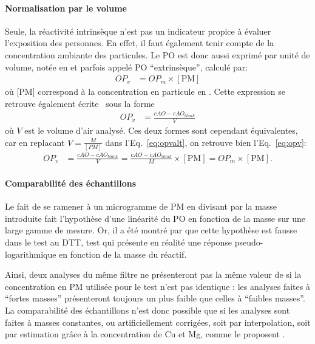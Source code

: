 \paragraph{Normalisation par le volume}%
\label{par:normalisation_par_le_volume}

Seule, la réactivité intrinsèque n'est pas un indicateur propice à évaluer
l'exposition des personnes. En
effet, il faut également tenir compte de la concentration ambiante des particules. Le PO
est donc aussi exprimé par unité de volume, notée \OPv{} en \si{\opv} et parfois appelé PO
``extrinsèque'', calculé par:
\begin{align}
    \label{eq:opv}
    OP_v &= OP_m \times [\text{PM}]
\end{align}
où [PM] correspond à la concentration en particule en \si{\ugm}. Cette expression se
retrouve également écrite~\autocite{fangSemiautomated2015} sous la forme
\begin{align}
    \label{eq:opvalt}
    OP_v &= \frac{cAO - cAO_{blank}}{V}
\end{align}
où $V$ est le volume d'air analysé. Ces deux formes sont cependant équivalentes, car en
replacant $V = \frac{M}{[PM]}$ dans l'Eq.~\ref{eq:opvalt}, on retrouve bien
l'Eq.~\ref{eq:opv}:
\begin{align}
    \label{eq:opvopvalt}
    OP_v &= \frac{cAO -cAO_{blank}}{V} = \frac{cAO -cAO_{blank}}{M}\times [\text{PM}] = OP_m \times [\text{PM}].
\end{align}

\paragraph{Comparabilité des échantillons}%
\label{par:comparabilité_des_échantillons}

Le fait de se ramener à un microgramme de PM en divisant par la masse introduite fait
l'hypothèse d'une linéarité du PO en fonction de la masse sur une large gamme de mesure. Or, il a été montré par
\textcite{charrierDithiothreitol2012,charrierBias2016,calasComparison2018} que cette
hypothèse est fausse dans le test au DTT, test qui présente en réalité une réponse
pseudo-logarithmique en fonction de la masse du réactif.

Ainsi, deux analyses du même filtre ne présenteront pas la même valeur de \PODTTm{} si la
concentration en PM utilisée pour le test n'est pas identique : les analyses faites à ``fortes masses''
présenteront toujours un \PODTTm{} plus faible que celles à ``faibles masses''.
La comparabilité des échantillons n'est donc possible que si les analyses sont faites à
masses constantes, ou artificiellement corrigées, soit par interpolation, soit par
estimation grâce à la concentration de Cu et Mg, comme le proposent
\textcite{charrierBias2016}.

